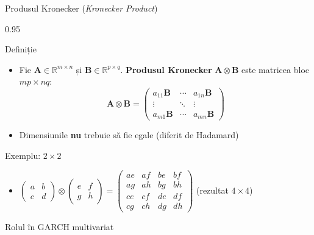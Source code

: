 \documentclass[9pt, aspectratio=169, t]{beamer}
\begin{document}
\begin{frame}{Produsul Kronecker (\textit{Kronecker Product})}
    \begin{cminipage}{0.95\textwidth}
    \vspace{-3mm}
    {\scriptsize
    \begin{block}{Definiție}
        \begin{itemize}\setlength{\itemsep}{0pt}
            \item Fie $\mathbf{A} \in \mathbb{R}^{m \times n}$ și $\mathbf{B} \in \mathbb{R}^{p \times q}$. \textbf{Produsul Kronecker} $\mathbf{A} \otimes \mathbf{B}$ este matricea bloc $mp \times nq$:
            \vspace{-1mm}
            \[
                \mathbf{A} \otimes \mathbf{B} = \begin{pmatrix} a_{11}\mathbf{B} & \cdots & a_{1n}\mathbf{B} \\ \vdots & \ddots & \vdots \\ a_{m1}\mathbf{B} & \cdots & a_{mn}\mathbf{B} \end{pmatrix}
            \]
            \vspace{-3mm}
            \item Dimensiunile \textbf{nu} trebuie să fie egale (diferit de Hadamard)
        \end{itemize}
    \end{block}
    \vspace{-2mm}
    \begin{block}{Exemplu: $2 \times 2$}
        \begin{itemize}\setlength{\itemsep}{0pt}
            \item $\begin{pmatrix} a & b \\ c & d \end{pmatrix} \otimes \begin{pmatrix} e & f \\ g & h \end{pmatrix} = \begin{pmatrix} ae & af & be & bf \\ ag & ah & bg & bh \\ ce & cf & de & df \\ cg & ch & dg & dh \end{pmatrix}$ \quad (rezultat $4 \times 4$)
        \end{itemize}
    \end{block}
    \vspace{-2mm}
    \begin{alertblock}{Rolul în GARCH multivariat}

\end{alertblock}}
\end{cminipage}
\end{frame}
\end{document}
